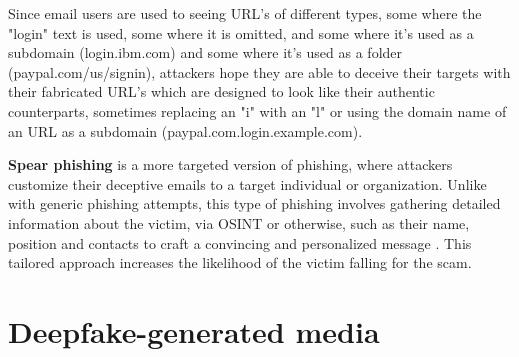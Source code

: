Since email users are used to seeing URL's of different types, some where the "login" text is used, some where it is omitted, and some where it's used as a subdomain (login.ibm.com) and some where it's used as a folder (paypal.com/us/signin), attackers hope they are able to deceive their targets with their fabricated URL's which are designed to look like their authentic counterparts, sometimes replacing an "i" with an "l" or using the domain name of an URL as a subdomain (paypal.com.login.example.com).

\textbf{Spear phishing} is a more targeted version of phishing, where attackers customize their deceptive emails to a target individual or organization. Unlike with generic phishing attempts, this type of phishing involves gathering detailed information about the victim, via OSINT or otherwise, such as their name, position and contacts to craft a convincing and personalized message \citep{salahdine_social_2019}. This tailored approach increases the likelihood of the victim falling for the scam.





\section{Deepfake-generated media}
\begin{comment}
    
    -

\end{comment}

